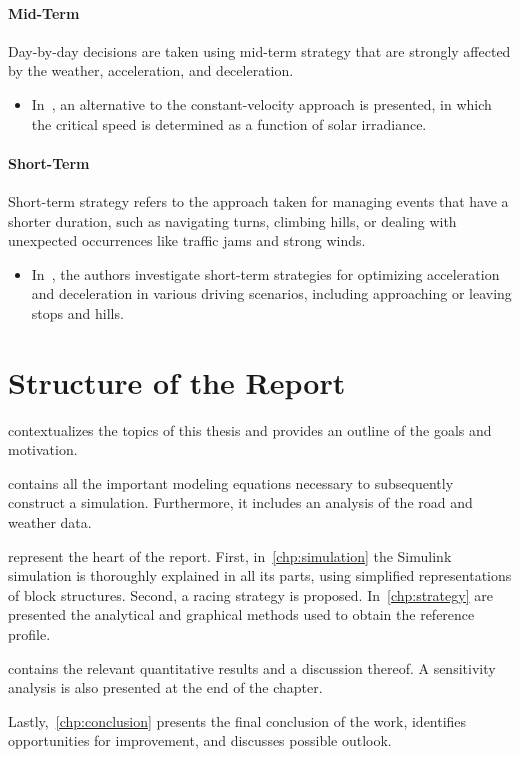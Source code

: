 \paragraph{Mid-Term}
Day-by-day decisions are taken using mid-term strategy that are strongly affected by the weather, acceleration, and deceleration.
\begin{itemize}
	\item In~\cite{criticalSpeedControl:2002article}, an alternative to the constant-velocity approach is presented, in which the critical speed is determined as a function of solar irradiance.
\end{itemize}
\paragraph{Short-Term}
Short-term strategy refers to the approach taken for managing events that have a shorter duration, such as navigating turns, climbing hills, or dealing with unexpected occurrences like traffic jams and strong winds.
\begin{itemize}
	\item In~\cite{racingWithTheSun:1997}, the authors investigate short-term strategies for optimizing acceleration and deceleration in various driving scenarios, including approaching or leaving stops and hills.
\end{itemize}


\section{Structure of the Report}
 contextualizes the topics of this thesis and provides an outline of the goals and motivation.

 contains all the important modeling equations necessary to subsequently construct a simulation. Furthermore, it includes an analysis of the road and weather data.

 represent the heart of the report. First, in~\cref{chp:simulation} the Simulink simulation is thoroughly explained in all its parts, using simplified representations of block structures. Second, a racing strategy is proposed. In~\cref{chp:strategy} are presented the analytical and graphical methods used to obtain the reference profile.

 contains the relevant quantitative results and a discussion thereof. A sensitivity analysis is also presented at the end of the chapter.

Lastly,~\cref{chp:conclusion} presents the final conclusion of the work, identifies opportunities for improvement, and discusses possible outlook.